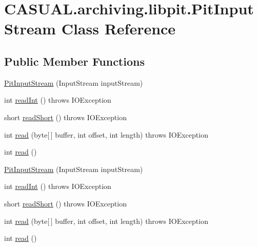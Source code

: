 \hypertarget{class_c_a_s_u_a_l_1_1archiving_1_1libpit_1_1_pit_input_stream}{\section{C\-A\-S\-U\-A\-L.\-archiving.\-libpit.\-Pit\-Input\-Stream Class Reference}
\label{class_c_a_s_u_a_l_1_1archiving_1_1libpit_1_1_pit_input_stream}
}
\subsection*{Public Member Functions}
\begin{DoxyCompactItemize}
\item 
\hyperlink{class_c_a_s_u_a_l_1_1archiving_1_1libpit_1_1_pit_input_stream_ace85a9c91595391bfe159a6e6a153827}{Pit\-Input\-Stream} (Input\-Stream input\-Stream)
\item 
int \hyperlink{class_c_a_s_u_a_l_1_1archiving_1_1libpit_1_1_pit_input_stream_abba0bb2226797c2f0d6c9436a96f640b}{read\-Int} ()  throws I\-O\-Exception 
\item 
short \hyperlink{class_c_a_s_u_a_l_1_1archiving_1_1libpit_1_1_pit_input_stream_a14b405dae50f11155d6e103060c030c8}{read\-Short} ()  throws I\-O\-Exception 
\item 
int \hyperlink{class_c_a_s_u_a_l_1_1archiving_1_1libpit_1_1_pit_input_stream_afc530392ae793883b5a1f620440ab9fa}{read} (byte\mbox{[}$\,$\mbox{]} buffer, int offset, int length)  throws I\-O\-Exception 
\item 
int \hyperlink{class_c_a_s_u_a_l_1_1archiving_1_1libpit_1_1_pit_input_stream_ad47d7e44758ae65cdf4aca98443b00cd}{read} ()
\item 
\hyperlink{class_c_a_s_u_a_l_1_1archiving_1_1libpit_1_1_pit_input_stream_ace85a9c91595391bfe159a6e6a153827}{Pit\-Input\-Stream} (Input\-Stream input\-Stream)
\item 
int \hyperlink{class_c_a_s_u_a_l_1_1archiving_1_1libpit_1_1_pit_input_stream_abba0bb2226797c2f0d6c9436a96f640b}{read\-Int} ()  throws I\-O\-Exception 
\item 
short \hyperlink{class_c_a_s_u_a_l_1_1archiving_1_1libpit_1_1_pit_input_stream_a14b405dae50f11155d6e103060c030c8}{read\-Short} ()  throws I\-O\-Exception 
\item 
int \hyperlink{class_c_a_s_u_a_l_1_1archiving_1_1libpit_1_1_pit_input_stream_afc530392ae793883b5a1f620440ab9fa}{read} (byte\mbox{[}$\,$\mbox{]} buffer, int offset, int length)  throws I\-O\-Exception 
\item 
int \hyperlink{class_c_a_s_u_a_l_1_1archiving_1_1libpit_1_1_pit_input_stream_ad47d7e44758ae65cdf4aca98443b00cd}{read} ()
\end{DoxyCompactItemize}


